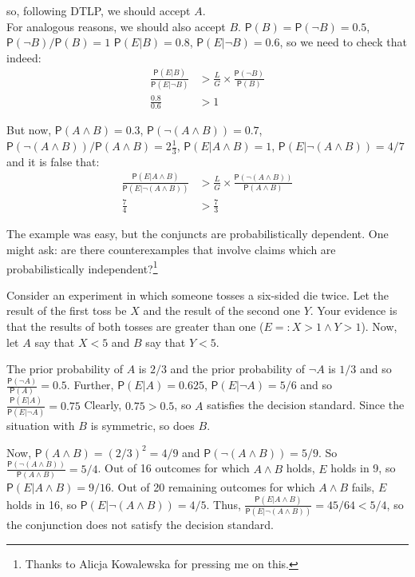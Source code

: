 \documentclass[10pt,dvipsnames,enabledeprecatedfontcommands]{scrartcl}
\newcommand{\n}{\neg}
\newcommand{\et}{\wedge}
\newcommand{\pr}[1]{\mathsf{P}(#1)}
\begin{document}
\noindent so, following DTLP, we should accept \(A\).\\
For analogous reasons, we should also accept \(B\).
\(\pr{B}=\pr{\n B}=0.5\), \(\pr{\n B}/\pr{B}=1\) \(\pr{E\vert B}=0.8\),
\(\pr{E\vert \n B}=0.6\), so we need to check that indeed:
\begin{align*}
 \frac{\pr{E\vert B}}{\pr{E\vert \n B}}&> \frac{L}{G}\times \frac{\pr{\n B}}{\pr{B}}\\
 \frac{0.8}{0.6} & > 1 
 \end{align*}

But now, \(\pr{A\et B}=0.3\), \(\pr{\n (A \et B)}=0.7\),
\(\pr{\n (A\et B)}/\pr{A\et B}=2\frac{1}{3}\),
\(\pr{E\vert A \et B}=1\), \(\pr{E\vert \n (A\et B)}=4/7\) and it is
false that: \begin{align*}
 \frac{\pr{E\vert A \et B}}{\pr{E\vert \n (A\et B)}}&> \frac{L}{G}\times \frac{\pr{\n (A \et B)}}{\pr{A \et B}}\\
 \frac{7}{4} & > \frac{7}{3} 
 \end{align*}

The example was easy, but the conjuncts are probabilistically dependent.
One might ask: are there counterexamples that involve claims which are
probabilistically
independent?\footnote{Thanks to Alicja Kowalewska for pressing me on this.}

Consider an experiment in which someone tosses a six-sided die twice.
Let the result of the first toss be \(X\) and the result of the second
one \(Y\). Your evidence is that the results of both tosses are greater
than one (\(E=: X>1 \et Y>1\)). Now, let \(A\) say that \(X<5\) and
\(B\) say that \(Y<5\).

The prior probability of \(A\) is \(2/3\) and the prior probability of
\(\n A\) is \(1/3\) and so \(\frac{\pr{\n A}}{\pr{A}}=0.5\). Further,
\(\pr{E\vert A}=0.625\), \(\pr{E\vert \n A}= 5/6\) and so
\(\frac{\pr{E\vert A}}{\pr{E\vert \n A}}=0.75\) Clearly, \(0.75>0.5\),
so \(A\) satisfies the decision standard. Since the situation with \(B\)
is symmetric, so does \(B\).

Now, \(\pr{A\et B}=(2/3)^2=4/9\) and \(\pr{\n (A\et B)}=5/9\). So
\(\frac{\pr{\n(A\et B)}}{\pr{A\et B}}=5/4\). Out of 16 outcomes for
which \(A\et B\) holds, \(E\) holds in 9, so
\(\pr{E\vert A\et B}=9/16\). Out of 20 remaining outcomes for which
\(A\et B\) fails, \(E\) holds in 16, so \(\pr{E\vert \n (A\et B)}=4/5\).
Thus, \(\frac{\pr{E\vert A\et B}}{\pr{E\vert \n (A\et B)}}=45/64 <5/4\),
so the conjunction does not satisfy the decision standard.
\end{document}
